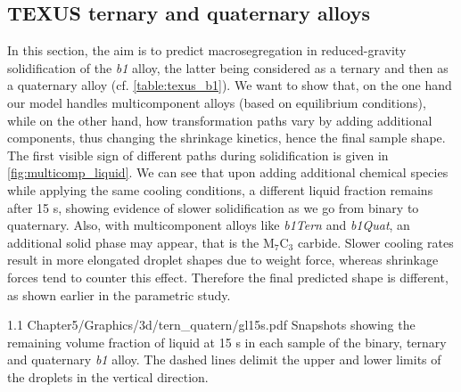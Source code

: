 


\subsection{TEXUS ternary and quaternary alloys}

In this section, the aim is to predict macrosegregation in reduced-gravity solidification of the \emph{b1} alloy, the latter being considered 
as a ternary and then as a quaternary alloy (cf. \cref{table:texus_b1}). 
We want to show that, on the one hand our model handles multicomponent alloys (based on equilibrium conditions), while
on the other hand, how transformation paths vary by adding additional components, thus changing the shrinkage kinetics, hence the final sample shape.
The first visible sign of different paths during solidification is given in \cref{fig:multicomp_liquid}. We can see that upon adding
additional chemical species while applying the same cooling conditions, a different liquid fraction remains after 15 s, showing evidence 
of slower solidification as we go from binary to quaternary. Also, with multicomponent alloys like \emph{b1Tern} and \emph{b1Quat}, an additional solid
phase may appear, that is the M$_7$C$_3$ carbide.
Slower cooling rates result in more elongated droplet shapes due to weight force, whereas shrinkage forces tend to counter this effect.
Therefore the final predicted shape is different, as shown earlier in the parametric study.

\begin{figureth}
{1.1}
{Chapter5/Graphics/3d/tern_quatern/gl15s.pdf}
{Snapshots showing the remaining volume fraction of liquid at 15 s in each sample of the binary, ternary and quaternary \emph{b1} alloy.
The dashed lines delimit the upper and lower limits of the droplets in the vertical direction.}
\label{fig:multicomp_liquid}
\end{figureth}

